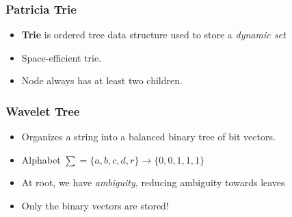 \documentclass{beamer}
\begin{document}
\begin{frame}
\frametitle{Patricia Trie}
\begin{itemize}
  \item {\bf Trie} is ordered tree data structure used to store a \emph{dynamic set}
  \item Space-efficient trie.
  \item Node always has at least two children.
\end{itemize}
\begin{figure}
\end{figure}
\end{frame}


\begin{frame}
\frametitle{Wavelet Tree}
\begin{itemize}
  \item Organizes a string into a balanced binary tree of bit vectors.
  \item Alphabet $\sum = \{a,b,c,d,r\} \rightarrow \{0, 0, 1, 1, 1\}$
  \item At root, we have \emph{ambiguity}, reducing ambiguity towards leaves
  \item Only the binary vectors are stored!
\end{itemize}
\begin{figure}
\end{figure}
\end{frame}
\end{document}
